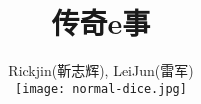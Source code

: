 %
%
\hypersetup{CJKbookmarks=true}
\title{\Huge \youyuan \textbf{传奇e事}}
\author{\youyuan Rickjin(靳志辉), LeiJun(雷军) \\
\texttt{[image: normal-dice.jpg]}
}

\maketitle
\tableofcontents


